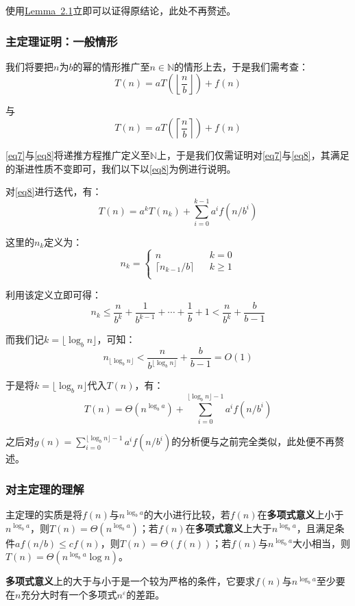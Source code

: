 \documentclass[12pt,a4paper,violet]{bbe}
\begin{document}
使用\hyperref[le2.1]{Lemma~2.1}立即可以证得原结论，此处不再赘述。
\subsubsection{主定理证明：一般情形}
我们将要把$n$为$b$的幂的情形推广至$n\in \mathbb{N}$的情形上去，于是我们需考查：
\begin{equation}
	T(n)=aT\left(\left\lfloor\frac{n}{b}\right\rfloor\right)+f(n)
	\label{eq7}
\end{equation}

与
\begin{equation}
	T(n)=aT\left(\left\lceil\frac{n}{b}\right\rceil\right)+f(n)
	\label{eq8}
\end{equation}


\cref{eq7}与\cref{eq8}将递推方程推广定义至$\mathbb{N}$上，于是我们仅需证明对\cref{eq7}与\cref{eq8}，其满足的渐进性质不变即可，我们以下以\cref{eq8}为例进行说明。

对\cref{eq8}进行迭代，有：
$$
T(n)=a^kT(n_k)+\sum\limits_{i=0}^{k-1}a^if(n/b^i)
$$

这里的$n_k$定义为：
$$
n_k=\left\{\begin{array}{lcc}
	n &&k=0\\
	\lceil n_{k-1}/b\rceil&&k\geqslant1\\
\end{array}\right.
$$

利用该定义立即可得：
$$
n_k\leqslant \frac{n}{b^k}+\frac{1}{b^{k-1}}+\cdots+\frac{1}{b}+1<\frac{n}{b^k}+\frac{b}{b-1}
$$

而我们记$k=\lfloor\log_b n\rfloor$，可知：
$$
n_{\lfloor\log_b n\rfloor}<\frac{n}{b^{\lfloor\log_b n\rfloor}}+\frac{b}{b-1}=O(1)
$$

于是将$k=\lfloor\log_b n\rfloor$代入$T(n)$，有：
$$
T(n)=\Theta(n^{\log_ba})+\sum\limits_{i=0}^{\lfloor\log_bn\rfloor-1}a^if(n/b^i)
$$

之后对$g(n)=\sum\limits_{i=0}^{\lfloor\log_bn\rfloor-1}a^if(n/b^i)$的分析便与之前完全类似，此处便不再赘述。
\subsubsection{对主定理的理解}
主定理的实质是将$f(n)$与$n^{\log_ba}$的大小进行比较，若$f(n)$在\textbf{多项式意义}上小于$n^{\log_ba}$，则$T(n)=\Theta(n^{\log_ba})$；若$f(n)$在\textbf{多项式意义}上大于$n^{\log_ba}$，且满足条件$af(n/b)\leqslant cf(n)$，则$T(n)=\Theta(f(n))$；若$f(n)$与$n^{\log_ba}$大小相当，则$T(n)=\Theta(n^{\log_ba}\log n)$。
\begin{remark}
	\textbf{多项式意义}上的大于与小于是一个较为严格的条件，它要求$f(n)$与$n^{\log_ba}$至少要在$n$充分大时有一个多项式$n^\varepsilon$的差距。
\end{remark}
\end{document}
